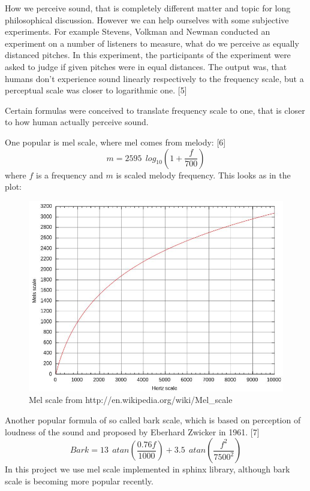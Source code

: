 \documentclass[12pt,a4paper,english]{article}
\begin{document}
How we perceive sound, that is completely different matter and topic for long philosophical discussion. However we can help ourselves with some subjective experiments. For example Stevens, Volkman and Newman conducted an experiment on a number of listeners to measure, what do we perceive as equally distanced pitches. In this experiment, the participants of the experiment were asked to judge if given pitches were in equal distances. The output was, that humans don't experience sound linearly respectively to the frequency scale, but a perceptual scale was closer to logarithmic one. [5] \newline

Certain formulas were conceived to translate frequency scale to one, that is closer to how human actually perceive sound. \newline

One popular is mel scale, where mel comes from melody: [6] \newline
\begin{equation}
    m = 2595 \: \: log_{10}(1 + \frac{f}{700})
\end{equation}
where $f$ is a frequency and $m$ is scaled melody frequency. \newline
This looks as in the plot:
\begin{figure}[hb]
    \centering
    \includegraphics[scale=0.3]{mel_scale.jpg}
    \caption[]{Mel scale from http://en.wikipedia.org/wiki/Mel\_scale}
\end{figure}

Another popular formula of so called bark scale, which is based on perception of loudness of the sound and proposed by Eberhard Zwicker in 1961. [7] \newline
\begin{equation}
    Bark = 13 \: \: atan(\frac{0.76f}{1000}) + 3.5 \: \: atan(\frac{f^2}{7500^2})
\end{equation}
In this project we use mel scale implemented in sphinx library, although bark scale is becoming more popular recently.
\end{document}
